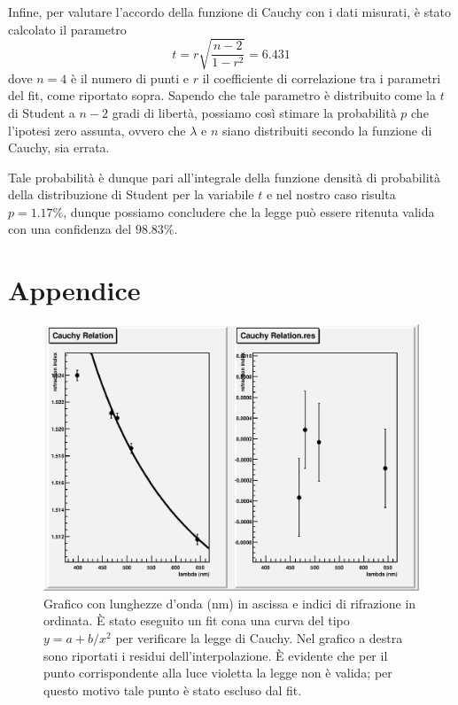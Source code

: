 \documentclass[italian,a4paper]{article}
\begin{document}
Infine, per valutare l'accordo della funzione di Cauchy con i dati misurati, è stato calcolato il parametro
\begin{equation}
t=r\sqrt{\dfrac{n-2}{1-r^2}} = 6.431
\end{equation}
dove $n=4$ è il numero di punti e $r$ il coefficiente di correlazione tra i parametri del fit, come riportato sopra. Sapendo che tale parametro è distribuito come la $t$ di Student a $n-2$ gradi di libertà, possiamo così stimare la probabilità $p$ che l'ipotesi zero assunta, ovvero che $\lambda$ e $n$ siano distribuiti secondo la funzione di Cauchy, sia errata.

Tale probabilità è dunque pari all'integrale della funzione densità di probabilità della distribuzione di Student per la variabile $t$ e nel nostro caso risulta $p = 1.17 \%$, dunque possiamo concludere che la legge può essere ritenuta valida con una confidenza del $98.83\%$.


\newpage
\section{Appendice}
\begin{figure}[!h]\centering
\includegraphics[scale=.6]{cauchy1.eps}
\caption{Grafico con lunghezze d'onda (\unit{nm}) in ascissa e indici di rifrazione in ordinata. \`{E} stato eseguito un fit cona una curva del tipo $y=a+b/x^2$ per verificare la legge di Cauchy. Nel grafico a destra sono riportati i residui dell'interpolazione. \`{E} evidente che per il punto corrispondente alla luce violetta la legge non è valida; per questo motivo tale punto è stato escluso dal fit.}\label{cauchy}
\end{figure}
\end{document}

